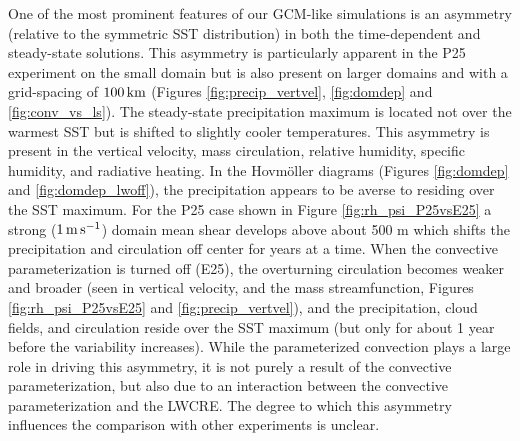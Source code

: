 \documentclass[draft]{agujournal2019}
\begin{document}
One of the most prominent features of our GCM-like simulations is an asymmetry (relative to the 
symmetric SST distribution) in both the time-dependent and steady-state solutions.  
This asymmetry is particularly apparent in the P25 experiment on the small domain but is also present on larger domains and 
with a grid-spacing of $100 \, \rm{km}$ (Figures  \ref{fig:precip_vertvel}, \ref{fig:domdep} and  \ref{fig:conv_vs_ls}). 
The steady-state precipitation maximum is located  not over the warmest SST but is shifted to slightly cooler temperatures.  
This asymmetry is present in the vertical velocity, mass circulation, relative humidity, specific humidity, and radiative heating.  
In the Hovm{\"o}ller diagrams (Figures \ref{fig:domdep} and \ref{fig:domdep_lwoff}), the precipitation appears to be averse 
to residing over the SST maximum.  
For the P25 case shown in Figure \ref{fig:rh_psi_P25vsE25} a strong ($1 \, \rm{m \, s^{-1}}$) domain
mean shear develops above about 500 m which shifts the precipitation and circulation off center for years at a time.  
When the convective parameterization is turned off (E25), the overturning circulation 
becomes weaker and broader (seen in vertical velocity, and the mass streamfunction, Figures \ref{fig:rh_psi_P25vsE25} and \ref{fig:precip_vertvel}), 
and the precipitation, cloud fields, and circulation reside over the SST maximum (but only for about 1 year before the variability 
increases).    
While the parameterized convection plays a large role in driving this asymmetry, it is not purely a 
result of the convective parameterization, but also due to an interaction between the convective 
parameterization and the LWCRE.   The degree to which this asymmetry influences the comparison with other 
experiments is unclear.     
\end{document}
